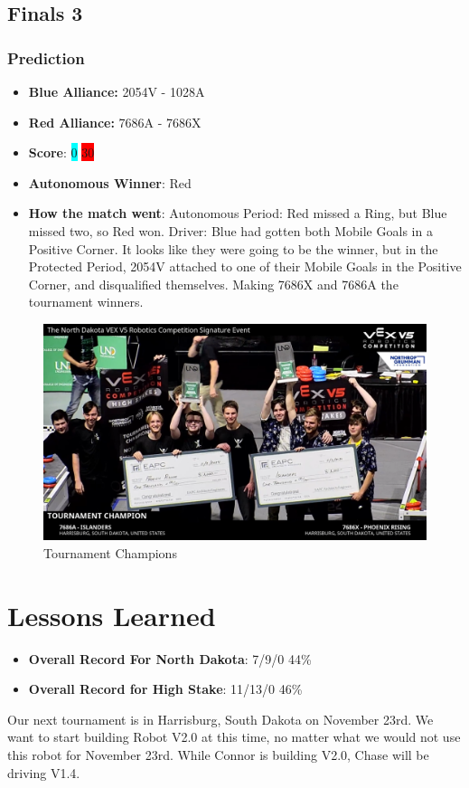 \subsection*{Finals 3}
\subsubsection*{Prediction}

\begin{itemize}
    \item \textbf{Blue Alliance:} 2054V - 1028A
    \item \textbf{Red Alliance:} 7686A - 7686X
    \item \textbf{Score}: \colorbox{cyan}{0}
    \colorbox{red}{30}
    \item \textbf{Autonomous Winner}: Red
    \item \textbf{How the match went}: Autonomous Period: Red missed a Ring, but Blue missed two, so Red won. Driver: Blue had gotten both Mobile Goals in a Positive Corner. It looks like they were going to be the winner, but in the Protected Period, 2054V attached to one of their Mobile Goals in the Positive Corner, and disqualified themselves. Making 7686X and 7686A the tournament winners.
\end{itemize}
\begin{figure}[H]
    \centering
    \includegraphics[width=0.8\linewidth]{images/streampicture.png}
    \caption{Tournament Champions}
    \label{fig:tournamentchamps}
\end{figure}
\section*{Lessons Learned}
\begin{itemize}
    \item \textbf{Overall Record For North Dakota}: 7/9/0 44\%
    \item \textbf{Overall Record for High Stake}: 11/13/0 46\%
\end{itemize}
Our next tournament is in Harrisburg, South Dakota on November 23rd. We want to start building Robot V2.0 at this time, no matter what we would not use this robot for November 23rd. While Connor is building V2.0, Chase will be driving V1.4. 

